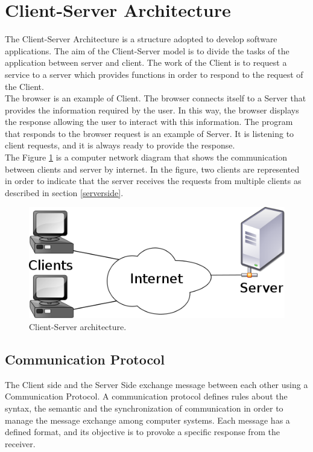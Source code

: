 \documentclass[a4paper]{report}
\begin{document}
\section{Client-Server Architecture}

The Client-Server Architecture is a structure adopted to develop software applications. The aim of the Client-Server model is to divide the tasks of the application between server and client. The work of the Client is to request a service to a server which provides functions in order to respond to the request of the Client.\\
The browser is an example of Client. The browser connects itself to a Server that provides the information required by the user. In this way, the browser displays the response allowing the user to interact with this information. The program that responds to the browser request is an example of Server. It is listening to client requests, and it is always ready to provide the response.\\
The Figure \ref{clientServer} is a computer network diagram that shows the communication between clients and server by internet. In the figure, two clients are represented in order to indicate that the server receives the requests from multiple clients as described in section \ref{serverside}. 

\begin{figure}[htb] 
\begin{center}
\includegraphics[scale=0.4]{figure/clientServer.png} 
\end{center}
\caption{Client-Server architecture.}
\label{clientServer}
\end{figure}

\subsection{Communication Protocol}

The Client side and the Server Side exchange message between each other using a Communication Protocol. A communication protocol defines rules about the syntax, the semantic and the synchronization of communication in order to manage the message exchange among computer systems.  Each message has a defined format, and its objective is to provoke a specific response from the receiver.\\
\end{document}
